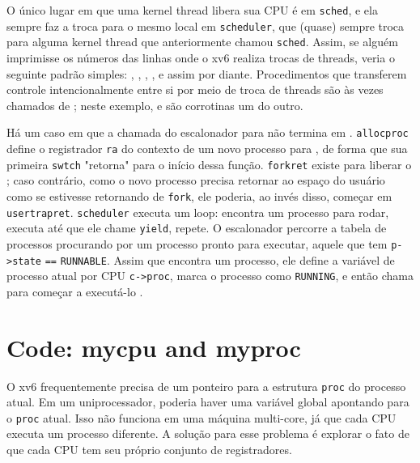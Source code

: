 O único lugar em que uma kernel thread libera sua CPU é em
\lstinline{sched},
e ela sempre faz a troca para o mesmo local em
\lstinline{scheduler}, que
(quase) sempre troca para alguma kernel thread que anteriormente chamou
\lstinline{sched}.
Assim, se alguém imprimisse os números das linhas onde o xv6 realiza trocas de threads, veria o seguinte padrão simples:
,
,
,
,
e assim por diante.
Procedimentos que transferem controle intencionalmente entre si por meio de troca de threads são às vezes chamados de
;
neste exemplo,
e
são corrotinas um do outro.

Há um caso em que a chamada do escalonador para
não termina em
.
\lstinline{allocproc}
define o registrador
\lstinline{ra}
do contexto de um novo processo para
,
de forma que sua primeira
\lstinline{swtch}
"retorna" para o início dessa função.
\lstinline{forkret}
existe para liberar o
;
caso contrário, como o novo processo precisa retornar ao espaço do usuário como se estivesse retornando de
\lstinline{fork},
ele poderia, ao invés disso, começar em
\lstinline{usertrapret}.
\lstinline{scheduler}
executa um loop:
encontra um processo para rodar, executa até que ele chame \texttt{yield}, repete.
O escalonador percorre a tabela de processos procurando por um processo pronto para executar, aquele que tem
\lstinline{p->state}
\lstinline{==}
\lstinline{RUNNABLE}.
Assim que encontra um processo, ele define a variável de processo atual por CPU
\lstinline{c->proc},
marca o processo como
\lstinline{RUNNING},
e então chama
para começar a executá-lo
.

\section{Code: mycpu and myproc}
O xv6 frequentemente precisa de um ponteiro para a estrutura \lstinline{proc} do processo atual.
Em um uniprocessador, poderia haver uma variável global apontando para o \lstinline{proc} atual.
Isso não funciona em uma máquina multi-core, já que cada CPU executa um processo diferente.
A solução para esse problema é explorar o fato de que cada CPU tem seu próprio conjunto de registradores.

